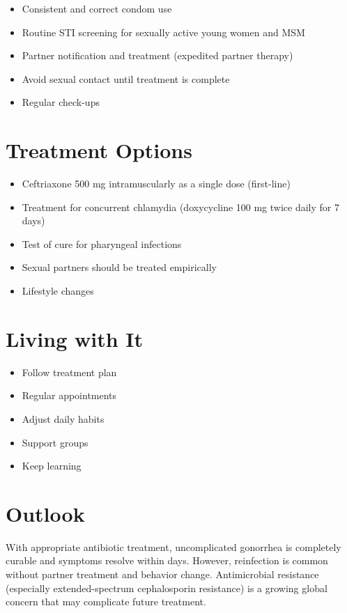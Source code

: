 \begin{itemize}[noitemsep]
  \item Consistent and correct condom use
  \item Routine STI screening for sexually active young women and MSM
  \item Partner notification and treatment (expedited partner therapy)
  \item Avoid sexual contact until treatment is complete
  \item Regular check-ups
\end{itemize}

\section{Treatment Options}

\begin{itemize}[noitemsep]
  \item Ceftriaxone 500 mg intramuscularly as a single dose (first-line)
  \item Treatment for concurrent chlamydia (doxycycline 100 mg twice daily for 7 days)
  \item Test of cure for pharyngeal infections
  \item Sexual partners should be treated empirically
  \item Lifestyle changes
\end{itemize}

\section{Living with It}

\begin{itemize}[noitemsep]
  \item Follow treatment plan
  \item Regular appointments
  \item Adjust daily habits
  \item Support groups
  \item Keep learning
\end{itemize}

\section{Outlook}
With appropriate antibiotic treatment, uncomplicated gonorrhea is completely curable and symptoms resolve within days. However, reinfection is common without partner treatment and behavior change. Antimicrobial resistance (especially extended-spectrum cephalosporin resistance) is a growing global concern that may complicate future treatment.
